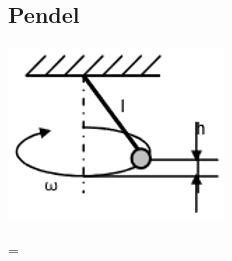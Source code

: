 \subsection{Pendel}
\begin{minipage}{\textwidth}	
	\begin{minipage}{0.2\textwidth}
		\includegraphics[width=\columnwidth]{./Images/pendel.png}
	\end{minipage}%
	\begin{minipage}{0.25\textwidth}	
		\begin{formula}
			{\omega = } 
		\end{formula}
	\end{minipage}
\end{minipage}
